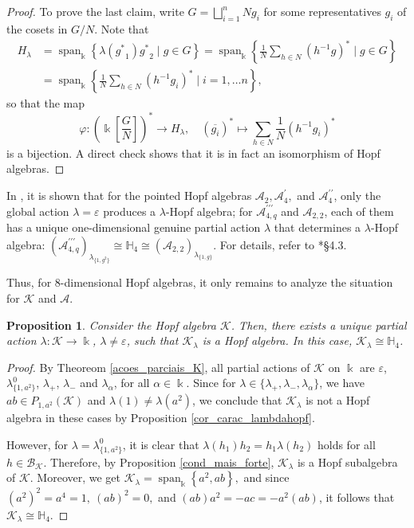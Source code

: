 \documentclass[reqno]{amsart}
\newtheorem{prop}[thm]{Proposition}
\theoremstyle{definition}
\DeclareMathOperator{\spn}{span}
\numberwithin{equation}{section}\theoremstyle{plain}
\newcommand{\B}{\mathcal{B}}
\theoremstyle{definition}
\def \k {\Bbbk}
\def \K {\mathcal{K}}
\def \A {\mathcal{A}}
\begin{document}
\begin{proof}
To prove the last claim, write \(G = \bigsqcup_{i = 1}^n N g_i\) for some representatives \(g_i\) of the cosets in \(G/N\).
Note that
\begin{align*}
    H_\lambda &=\spn_\k\left\{\lambda({g^*}_1){g^*}_2  \mid  g\in G\right\}=\spn_\k\left\{\frac{1}{N}\sum_{h\in N}(h^{-1}g)^* \mid g\in G\right\} \\
    &= \spn_\k\left\{\frac{1}{N}\sum_{h\in N}(h^{-1}g_i)^* \mid i = 1, \dots n \right\},
\end{align*}
so that the map 
\[\varphi : \left(\Bbbk \left[\frac{G}{N}\right]\right)^*\to H_\lambda, \quad \left(\overline{g_i}  \right)^{\ast} \mapsto \sum_{h\in N}\frac{1}{N}\left(h^{-1}g_i\right)^*\]
is a bijection. A direct check shows that it is in fact an isomorphism of Hopf algebras. 
\end{proof}

\medbreak





In \cite{corresponding}, it is shown that for the pointed Hopf algebras $\mathcal{A}_2, \mathcal{A}_4^\prime,$ and $ \mathcal{A}_4^{\prime \prime}$, only the global action \(\lambda = \varepsilon\) produces a $\lambda$-Hopf algebra;
for $\mathcal{A}_{4,q}^{\prime \prime \prime}$ and $\mathcal{A}_{2,2}$, each of them has a unique one-dimensional genuine partial action $\lambda$ that determines a $\lambda$-Hopf algebra: $(\mathcal{A}_{4,q}^{\prime \prime \prime})_{\lambda_{\{1, g^2\}}}\cong \mathbb{H}_4 \cong (\mathcal{A}_{2,2})_{\lambda_{\{1, g\}}}$.
For details, refer to \cite{corresponding}*{\S 4.3}. 

\medbreak

Thus, for 8-dimensional Hopf algebras, it only remains to analyze the situation for $\K$ and $\A$.

\begin{prop}
Consider the Hopf algebra $\K$.
Then, there exists a unique partial action $\lambda: \K \to \k$, $\lambda \neq \varepsilon$, such that $\K_\lambda$ is a Hopf algebra.
In this case, $\K_\lambda \cong \mathbb{H}_4$.
\end{prop}

\begin{proof} By Theoreom \ref{acoes_parciais_K},  all partial actions of $\K$ on $\Bbbk$ are $\varepsilon$, $\lambda_{\{1, a^2\}}^0$, $\lambda_{+}$, $\lambda_{-}$ and $\lambda_\alpha$, for all $\alpha \in \k$.
Since for $\lambda\in \{\lambda_{+}, \lambda_{-},\lambda_\alpha\} $, we have $ab \in P_{1, a^2}(\K)$ and $\lambda(1)\neq \lambda(a^2)$, we conclude that $\K_\lambda$ is not a Hopf algebra in these cases by Proposition \ref{cor_carac_lambdahopf}.

However, for $\lambda=\lambda_{\{1, a^2\}}^0$, it is clear that $\lambda(h_1)h_2=h_1 \lambda(h_2)$ holds for all $h\in\B_\K$.
Therefore, by Proposition \ref{cond_mais_forte}, $\K_\lambda$ is a Hopf subalgebra of $\K$.
Moreover, we get
        $\K_\lambda = \spn_\k\left\{ a^2, ab \right\},$
    and since $(a^2)^2 = a^4 = 1,\ (ab)^2 = 0,$ and $(ab)a^2 = - ac = - a^2 (ab)$, it follows that $\K_\lambda \cong \mathbb{H}_4$.
\end{proof}
\end{document}
